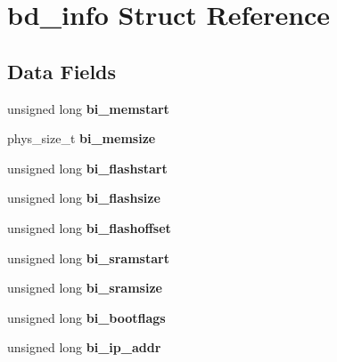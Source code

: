 \hypertarget{structbd__info}{}\section{bd\+\_\+info Struct Reference}
\label{structbd__info}
\subsection*{Data Fields}
\begin{DoxyCompactItemize}
\item 
\mbox{\label{structbd__info_a6fb1c200323f4a645a332f750bcda118}} 
unsigned long {\bfseries bi\+\_\+memstart}
\item 
\mbox{\label{structbd__info_a5d2dde0a3223f8a9a441bc406fb7d295}} 
phys\+\_\+size\+\_\+t {\bfseries bi\+\_\+memsize}
\item 
\mbox{\label{structbd__info_ab37a99ca859aca38b9e624396109f5bc}} 
unsigned long {\bfseries bi\+\_\+flashstart}
\item 
\mbox{\label{structbd__info_ab9a5f57e1618784050f92a0c6698e23a}} 
unsigned long {\bfseries bi\+\_\+flashsize}
\item 
\mbox{\label{structbd__info_a717492f577d8fcbdf471a6a8935974cb}} 
unsigned long {\bfseries bi\+\_\+flashoffset}
\item 
\mbox{\label{structbd__info_acb9d162923ca3a5b613fb2119f0ceabc}} 
unsigned long {\bfseries bi\+\_\+sramstart}
\item 
\mbox{\label{structbd__info_a4a15adeb1ffe05e170a409a8d73a280c}} 
unsigned long {\bfseries bi\+\_\+sramsize}
\item 
\mbox{\label{structbd__info_ae33dfce59a163d96cfaf701648daa2c0}} 
unsigned long {\bfseries bi\+\_\+bootflags}
\item 
\mbox{\label{structbd__info_a0512caff3897586be33d4c2c7b0166f9}} 
unsigned long {\bfseries bi\+\_\+ip\+\_\+addr}
\item 
\mbox{\label{structbd__info_ae6978f9a467b2e774ccfd54fb8f3fa2a}} 

\end{DoxyCompactItemize}
